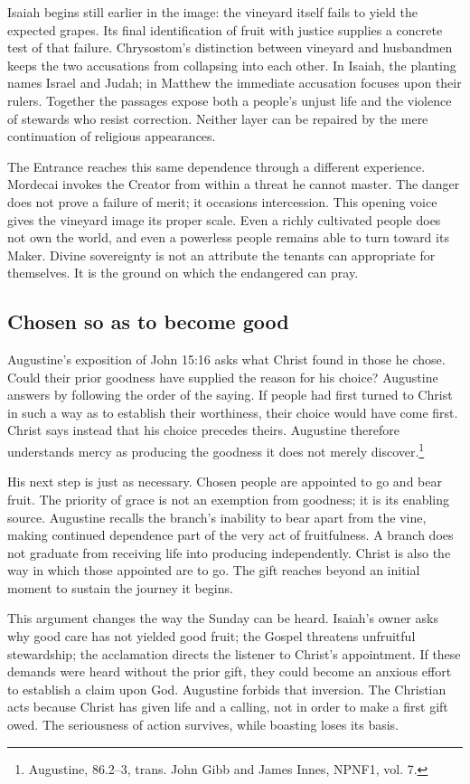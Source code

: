 Isaiah begins still earlier in the image: the vineyard itself fails to yield the expected grapes. Its final identification of fruit with justice supplies a concrete test of that failure. Chrysostom's distinction between vineyard and husbandmen keeps the two accusations from collapsing into each other. In Isaiah, the planting names Israel and Judah; in Matthew the immediate accusation focuses upon their rulers. Together the passages expose both a people's unjust life and the violence of stewards who resist correction. Neither layer can be repaired by the mere continuation of religious appearances.

The Entrance reaches this same dependence through a different experience. Mordecai invokes the Creator from within a threat he cannot master. The danger does not prove a failure of merit; it occasions intercession. This opening voice gives the vineyard image its proper scale. Even a richly cultivated people does not own the world, and even a powerless people remains able to turn toward its Maker. Divine sovereignty is not an attribute the tenants can appropriate for themselves. It is the ground on which the endangered can pray.

\subsection{Chosen so as to become good}
Augustine's exposition of John 15:16 asks what Christ found in those he chose. Could their prior goodness have supplied the reason for his choice? Augustine answers by following the order of the saying. If people had first turned to Christ in such a way as to establish their worthiness, their choice would have come first. Christ says instead that his choice precedes theirs. Augustine therefore understands mercy as producing the goodness it does not merely discover.\footnote{Augustine,  86.2--3, trans. John Gibb and James Innes, NPNF1, vol. 7.}

His next step is just as necessary. Chosen people are appointed to go and bear fruit. The priority of grace is not an exemption from goodness; it is its enabling source. Augustine recalls the branch's inability to bear apart from the vine, making continued dependence part of the very act of fruitfulness. A branch does not graduate from receiving life into producing independently. Christ is also the way in which those appointed are to go. The gift reaches beyond an initial moment to sustain the journey it begins.

This argument changes the way the Sunday can be heard. Isaiah's owner asks why good care has not yielded good fruit; the Gospel threatens unfruitful stewardship; the acclamation directs the listener to Christ's appointment. If these demands were heard without the prior gift, they could become an anxious effort to establish a claim upon God. Augustine forbids that inversion. The Christian acts because Christ has given life and a calling, not in order to make a first gift owed. The seriousness of action survives, while boasting loses its basis.

